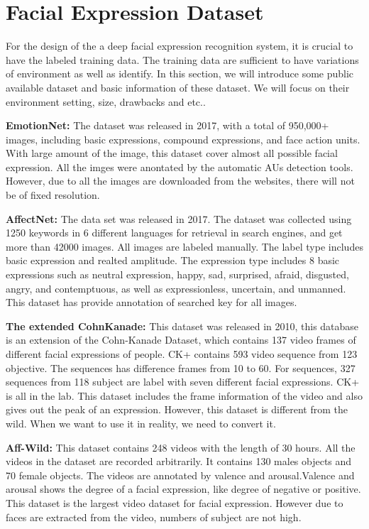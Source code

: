 \section{Facial Expression Dataset}
\label{sec:fed}
For the design of the a deep facial expression recognition system, it is crucial to have the labeled training data. The training data are sufficient to have variations of environment as well as identify. In this section, we will introduce some public available dataset and basic information of these dataset. We will focus on their environment setting, size, drawbacks and etc..

\textbf{EmotionNet:\citep{7780969} } The dataset was released in 2017, with a total of 950,000+ images, including basic expressions, compound expressions, and face action units. With large amount of the image, this dataset cover almost all possible facial expression. All the imges were anontated by the automatic AUs detection tools. However, due to all the images are downloaded from the websites, there will not be of fixed resolution.


\textbf{AffectNet:\citep{mollahosseini2017affectnet}} The data set was released in 2017.
The dataset was collected using 1250 keywords in 6 different languages for retrieval in search engines, and get more than 42000 images. All images are labeled manually. The label type includes basic expression and realted amplitude. The expression type includes 8 basic expressions such as neutral expression, happy, sad, surprised, afraid, disgusted, angry, and contemptuous, as well as expressionless, uncertain, and unmanned. This dataset has provide annotation of searched key for all images.

\textbf{The extended CohnKanade:\citep{lucey2010complete}} This dataset was released in 2010, this database is an extension of the Cohn-Kanade Dataset, which contains 137 video frames of different facial expressions of people. CK+ contains 593 video sequence from 123 objective. The sequences has difference frames from 10 to 60. For sequences, 327 sequences from 118 subject are label with seven different facial expressions. CK+ is all in the lab. This dataset includes the frame information of the video and also gives out the peak of an expression. However, this dataset is different from the wild. When we want to use it in reality, we need to convert it.

\textbf{Aff-Wild:\citep{zafeiriou2017aff}} This dataset contains 248 videos with the length of 30 hours. All the videos in the dataset are recorded arbitrarily. It contains 130 males objects and 70 female objects. The videos are annotated by valence and arousal.Valence and arousal shows the degree of a facial expression, like degree of negative or positive. This dataset is the largest video dataset for facial expression. However due to faces are extracted from the video, numbers of subject are not high.

